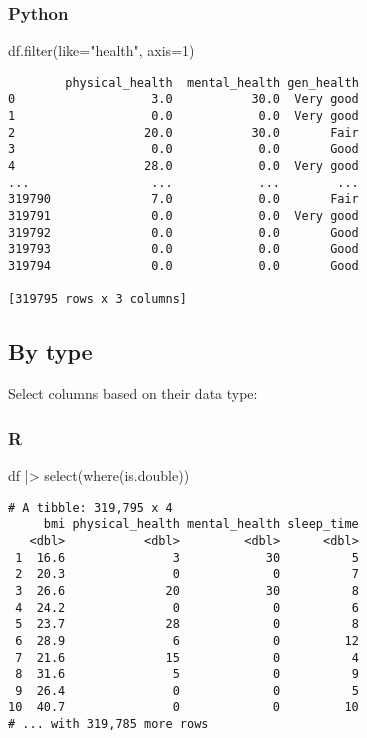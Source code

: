 \documentclass[
  letterpaper,
  DIV=11,
  numbers=noendperiod]{scrreprt}
\newenvironment{Shaded}{\begin{snugshade}}{\end{snugshade}}
\newcommand{\BuiltInTok}[1]{\textcolor[rgb]{0.00,0.46,0.62}{#1}}
\newcommand{\DecValTok}[1]{\textcolor[rgb]{0.68,0.00,0.00}{#1}}
\newcommand{\FunctionTok}[1]{\textcolor[rgb]{0.28,0.35,0.67}{#1}}
\newcommand{\NormalTok}[1]{\textcolor[rgb]{0.00,0.46,0.62}{#1}}
\newcommand{\OperatorTok}[1]{\textcolor[rgb]{0.37,0.37,0.37}{#1}}
\newcommand{\SpecialCharTok}[1]{\textcolor[rgb]{0.37,0.37,0.37}{#1}}
\newcommand{\StringTok}[1]{\textcolor[rgb]{0.13,0.47,0.30}{#1}}
\begin{document}
\hypertarget{python-19}{%
\subsubsection{Python}\label{python-19}}

\begin{Shaded}
\begin{Highlighting}[]
\NormalTok{df.}\BuiltInTok{filter}\NormalTok{(like}\OperatorTok{=}\StringTok{"health"}\NormalTok{, axis}\OperatorTok{=}\DecValTok{1}\NormalTok{)}
\end{Highlighting}
\end{Shaded}

\begin{verbatim}
        physical_health  mental_health gen_health
0                   3.0           30.0  Very good
1                   0.0            0.0  Very good
2                  20.0           30.0       Fair
3                   0.0            0.0       Good
4                  28.0            0.0  Very good
...                 ...            ...        ...
319790              7.0            0.0       Fair
319791              0.0            0.0  Very good
319792              0.0            0.0       Good
319793              0.0            0.0       Good
319794              0.0            0.0       Good

[319795 rows x 3 columns]
\end{verbatim}

\hypertarget{by-type}{%
\subsection{By type}\label{by-type}}

Select columns based on their data type:

\hypertarget{r-20}{%
\subsubsection{R}\label{r-20}}

\begin{Shaded}
\begin{Highlighting}[]
\NormalTok{df }\SpecialCharTok{|\textgreater{}} \FunctionTok{select}\NormalTok{(}\FunctionTok{where}\NormalTok{(is.double))}
\end{Highlighting}
\end{Shaded}

\begin{verbatim}
# A tibble: 319,795 x 4
     bmi physical_health mental_health sleep_time
   <dbl>           <dbl>         <dbl>      <dbl>
 1  16.6               3            30          5
 2  20.3               0             0          7
 3  26.6              20            30          8
 4  24.2               0             0          6
 5  23.7              28             0          8
 6  28.9               6             0         12
 7  21.6              15             0          4
 8  31.6               5             0          9
 9  26.4               0             0          5
10  40.7               0             0         10
# ... with 319,785 more rows
\end{verbatim}
\end{document}
